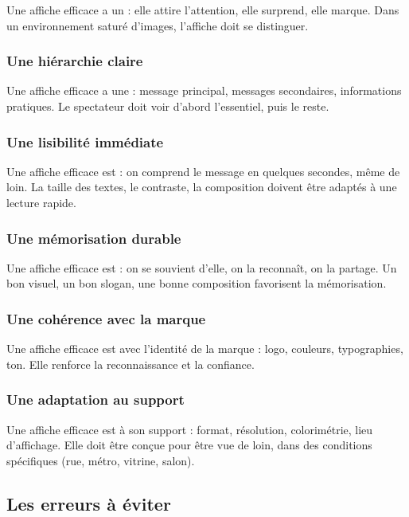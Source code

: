 Une affiche efficace a un  : elle attire l'attention, elle surprend, elle marque. Dans un environnement saturé d'images, l'affiche doit se distinguer.

\subsubsection{Une hiérarchie claire}

Une affiche efficace a une  : message principal, messages secondaires, informations pratiques. Le spectateur doit voir d'abord l'essentiel, puis le reste.

\subsubsection{Une lisibilité immédiate}

Une affiche efficace est  : on comprend le message en quelques secondes, même de loin. La taille des textes, le contraste, la composition doivent être adaptés à une lecture rapide.

\subsubsection{Une mémorisation durable}

Une affiche efficace est  : on se souvient d'elle, on la reconnaît, on la partage. Un bon visuel, un bon slogan, une bonne composition favorisent la mémorisation.

\subsubsection{Une cohérence avec la marque}

Une affiche efficace est  avec l'identité de la marque : logo, couleurs, typographies, ton. Elle renforce la reconnaissance et la confiance.

\subsubsection{Une adaptation au support}

Une affiche efficace est  à son support : format, résolution, colorimétrie, lieu d'affichage. Elle doit être conçue pour être vue de loin, dans des conditions spécifiques (rue, métro, vitrine, salon).

\subsection{Les erreurs à éviter}


